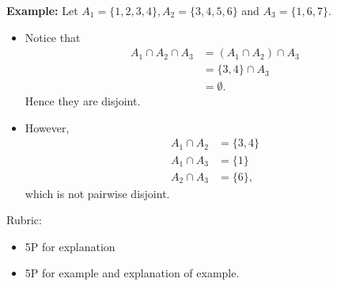 \documentclass{article}
\theoremstyle{definition}
\begin{document}
\begin{solution}
\textbf{Example:} Let $A_1=\{1, 2, 3, 4\}, A_2=\{3, 4, 5, 6\}$ and $A_3=\{1, 6, 7\}$.
\begin{itemize}
\item Notice that 
\begin{align*}
A_1\cap A_2\cap A_3 &= (A_1\cap A_2)\cap A_3\\
&=\{3,4\}\cap A_3\\
&=\emptyset.
\end{align*} Hence they are disjoint.
\item However,
\begin{align*}
A_1\cap A_2 &=\{3, 4\}\\
A_1\cap A_3 &=\{1\}\\
A_2\cap A_3 &=\{6\},
\end{align*}
which is not pairwise disjoint.
\end{itemize}

{\color{red} Rubric:
\begin{itemize}
\item 5P for explanation
\item 5P for example and explanation of example.
\end{itemize}}
\end{solution}
\end{document}
